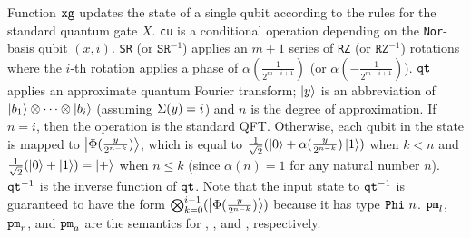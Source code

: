 Function $\texttt{xg}$ updates the state of a single
qubit according to the rules for the standard quantum gate $X$.  
\texttt{cu} is a conditional operation
depending on the \texttt{Nor}-basis qubit $(x,i)$. 
\texttt{SR} (or
$\texttt{SR}^{-1}$) applies an $m+1$ series of \texttt{RZ} (or
$\texttt{RZ}^{-1}$) rotations where the $i$-th rotation
applies a phase of $\alpha({\frac{1}{2^{m-i+1}}})$
(or $\alpha({-\frac{1}{2^{m-i+1}}})$).
$\texttt{qt}$ applies an approximate quantum Fourier transform; $\left\vert{y}\right\rangle$ is an abbreviation of
$\left\vert{b_1}\right\rangle\otimes \cdots \otimes \left\vert{b_i}\right\rangle$ (assuming $\Sigma(y)=i$)
and $n$ is the degree of approximation.
If $n = i$, then the operation is the standard QFT\@.
Otherwise, each qubit in the state is mapped to $\left\vert{\Phi(\frac{y}{2^{n-k}})}\right\rangle$, which is equal to $\frac{1}{\sqrt{2}}(\left\vert{0}\right\rangle + \alpha(\frac{y}{2^{n-k}})\left\vert{1}\right\rangle)$ when $k < n$ and $\frac{1}{\sqrt{2}}(\left\vert{0}\right\rangle + \left\vert{1}\right\rangle) = \left\vert{+}\right\rangle$ when $n \leq k$ (since $\alpha(n) = 1$ for any natural number $n$).
$\texttt{qt}^{-1}$ is the inverse function of $\texttt{qt}$. 
Note that the input state to $\texttt{qt}^{-1}$ is guaranteed to have the form $\bigotimes_{k=0}^{i-1}(\left\vert{\Phi(\frac{y}{2^{n-k}})}\right\rangle)$ because it has type $\texttt{Phi}~{n}$.
$\texttt{pm}_l$, $\texttt{pm}_r$, and
$\texttt{pm}_a$ are the semantics for , 
, and , respectively.   
